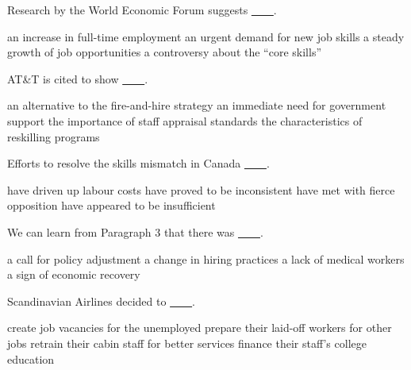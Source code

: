 \item Research by the World Economic Forum suggests \uline{~~~~}.
\begin{tasks}
	\task an increase in full-time employment
	\task an urgent demand for new job skills
	\task a steady growth of job opportunities
	\task a controversy about the ``core skills''
\end{tasks}
\item AT\&T is cited to show \uline{~~~~}.
\begin{tasks}
	\task an alternative to the fire-and-hire strategy
	\task an immediate need for government support
	\task the importance of staff appraisal standards
	\task the characteristics of reskilling programs
\end{tasks}
\item Efforts to resolve the skills mismatch in Canada \uline{~~~~}.
\begin{tasks}
	\task have driven up labour costs
	\task have proved to be inconsistent
	\task have met with fierce opposition
	\task have appeared to be insufficient
\end{tasks}
\item We can learn from Paragraph 3 that there was \uline{~~~~}.
\begin{tasks}
	\task a call for policy adjustment
	\task a change in hiring practices
	\task a lack of medical workers
	\task a sign of economic recovery
\end{tasks}
\item Scandinavian Airlines decided to \uline{~~~~}.
\begin{tasks}
	\task create job vacancies for the unemployed
	\task prepare their laid-off workers for other jobs
	\task retrain their cabin staff for better services
	\task finance their staff's college education
\end{tasks}